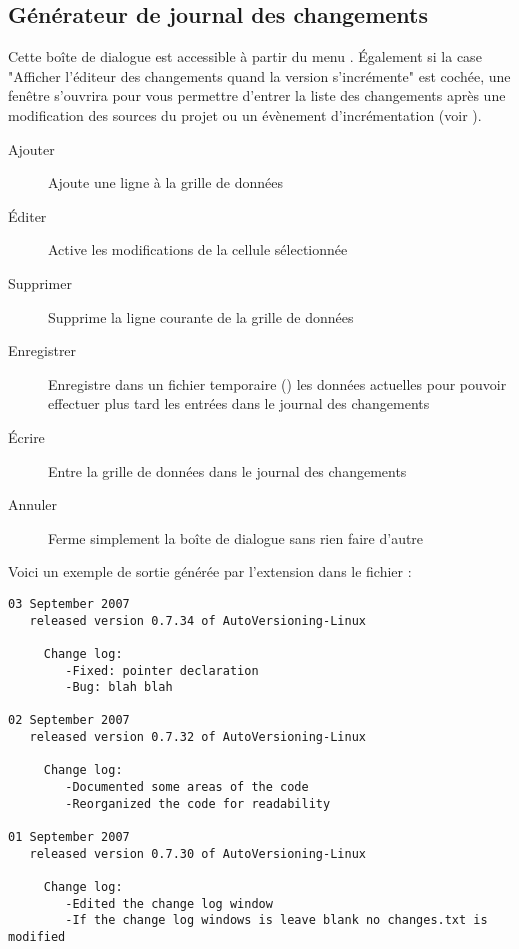\subsection{Générateur de journal des changements}

Cette boîte de dialogue est accessible à partir du menu . Également si la case "Afficher l'éditeur des changements quand la version s'incrémente" est cochée, une fenêtre s'ouvrira pour vous permettre d'entrer la liste des changements après une modification des sources du projet ou un évènement d'incrémentation (voir ).



\begin{description}
\item[Ajouter] Ajoute une ligne à la grille de données
\item[Éditer] Active les modifications de la cellule sélectionnée
\item[Supprimer] Supprime la ligne courante de la grille de données
\item[Enregistrer] Enregistre dans un fichier temporaire () les données actuelles pour pouvoir effectuer plus tard les entrées dans le journal des changements
\item[Écrire] Entre la grille de données dans le journal des changements
\item[Annuler] Ferme simplement la boîte de dialogue sans rien faire d'autre
\end{description}

Voici un exemple de sortie générée par l'extension dans le fichier  :

\begin{lstlisting}
03 September 2007
   released version 0.7.34 of AutoVersioning-Linux

     Change log:
        -Fixed: pointer declaration
        -Bug: blah blah

02 September 2007
   released version 0.7.32 of AutoVersioning-Linux

     Change log:
        -Documented some areas of the code
        -Reorganized the code for readability

01 September 2007
   released version 0.7.30 of AutoVersioning-Linux

     Change log:
        -Edited the change log window
        -If the change log windows is leave blank no changes.txt is modified
\end{lstlisting}

